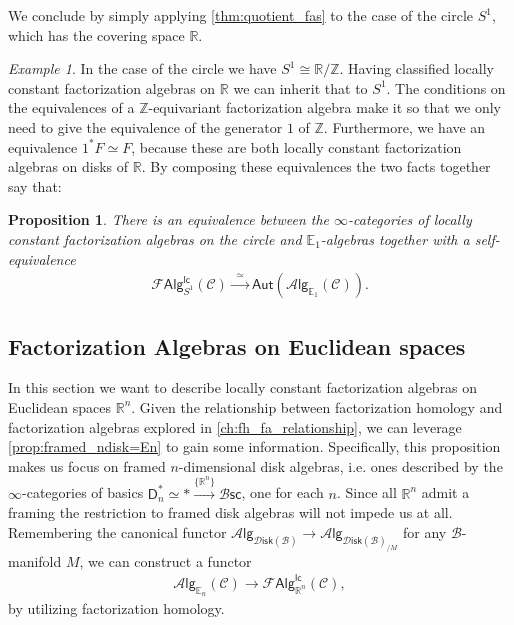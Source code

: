 \documentclass[12pt,a4paper]{article}
\newcounter{counter} \numberwithin{counter}{section}
\theoremstyle{definition}
\theoremstyle{plain}
\newtheorem{proposition}[counter]{Proposition}
\theoremstyle{remark}
\newtheorem{example}[counter]{Example}
\newcommand{\catC}{\mathscr{C}}
\newcommand{\lcfa}{\mathscr{F} \mathsf{Alg}^{\mathsf{lc}}}
\newcommand{\disk}{\mathscr{D} \mathsf{isk}}
\newcommand{\alg}[1]{\mathscr{A} \mathsf{lg}_{#1}}
\newcommand{\aut}{\mathsf{Aut}}
\newcommand{\bsc}{\mathscr{B} \mathsf{sc}}
\newcommand{\bstr}{\mathscr{B}}
\begin{document}
We conclude by simply applying \cref{thm:quotient_fas} to the case of the circle $S^1$, which has the covering space $\mathbb{R}$. 

\begin{example}
    In the case of the circle we have $S^1 \cong \mathbb{R}/\mathbb{Z}$. Having classified locally constant factorization algebras on $\mathbb{R}$ we can inherit that to $S^1$. The conditions on the equivalences of a $\mathbb{Z}$-equivariant factorization algebra make it so that we only need to give the equivalence of the generator $1$ of $\mathbb{Z}$. Furthermore, we have an equivalence $1^*F \simeq F$, because these are both locally constant factorization algebras on disks of $\mathbb{R}$. By composing these equivalences the two facts together say that:
\end{example}

\begin{proposition}\label{prop:lcfas_on_S1}
    There is an equivalence between the $\infty$-categories of locally constant factorization algebras on the circle and $\mathbb{E}_1$-algebras together with a self-equivalence
    \begin{align}
        \lcfa_{S^1} (\catC) \xrightarrow{\ \ \simeq \ \ } \aut (\alg{\mathbb{E}_1} (\catC)).
    \end{align}
\end{proposition}





\subsection{Factorization Algebras on Euclidean spaces}

In this section we want to describe locally constant factorization algebras on Euclidean spaces $\mathbb{R}^n$. Given the relationship between factorization homology and factorization algebras explored in \cref{ch:fh_fa_relationship}, we can leverage \cref{prop:framed_ndisk=En} to gain some information. Specifically, this proposition makes us focus on framed $n$-dimensional disk algebras, i.e. ones described by the $\infty$-categories of basics $\mathsf{D}_n^* \simeq * \xrightarrow{\{ \mathbb{R}^n\}} \bsc$, one for each $n$. Since all $\mathbb{R}^n$ admit a framing the restriction to framed disk algebras will not impede us at all. Remembering the canonical functor $\alg{\disk(\bstr)} \rightarrow \alg{\disk(\bstr)_{/M}}$ for any $\bstr$-manifold $M$, we can construct a functor
%
\begin{align}
    \alg{\mathbb{E}_n} (\catC) \xrightarrow{\quad} \lcfa_{\mathbb{R}^n} (\catC),
\end{align}
%
by utilizing factorization homology.
\end{document}
